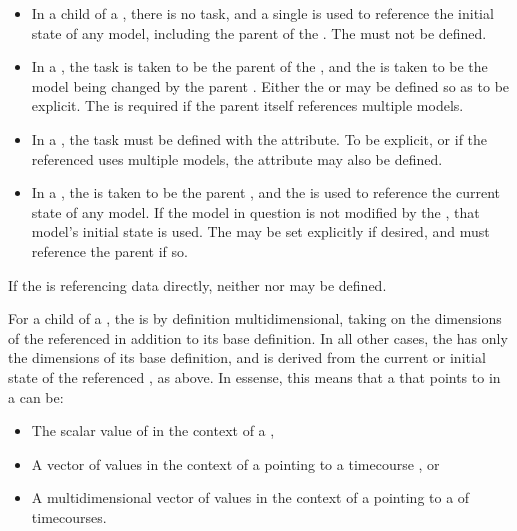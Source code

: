 \begin{blockChanged}
\begin{itemize}
        \item In a \ComputeChange child of a \Model, there is no task, and a single  is used to reference the initial state of any model, including the parent of the \ComputeChange.  The  must not be defined.
        \item In a \FunctionalRange, the task is taken to be the parent of the \FunctionalRange, and the  is taken to be the model being changed by the parent \AbstractTask.  Either the  or  may be defined so as to be explicit.  The  is required if the parent \AbstractTask itself references multiple models.
        \item In a \DataGenerator, the task must be defined with the  attribute.  To be explicit, or if the referenced \AbstractTask uses multiple models, the  attribute may also be defined.
        \item In a \SetValue, the  is taken to be the parent \AbstractTask, and the  is used to reference the current state of any model.  If the model in question is not modified by the \AbstractTask, that model's initial state is used.  The  may be set explicitly if desired, and must reference the parent \AbstractTask if so.
\end{itemize}

If the \Variable is referencing data directly, neither  nor  may be defined.

For a \Variable child of a \DataGenerator, the \Variable is by definition multidimensional, taking on the dimensions of the referenced \AbstractTask in addition to its base definition.  In all other cases, the \Variable has only the dimensions of its base definition, and is derived from the current or initial state of the referenced \Model, as above.  In essense, this means that a \Variable that points to  in a \Model can be:
\begin{itemize}
        \item The scalar value of  in the context of a \ComputeChange,
        \item A vector of  values in the context of a \DataGenerator pointing to a timecourse \Task, or
        \item A multidimensional vector of  values in the context of a \DataGenerator pointing to a \RepeatedTask of timecourses.
\end{itemize}

\end{blockChanged}

